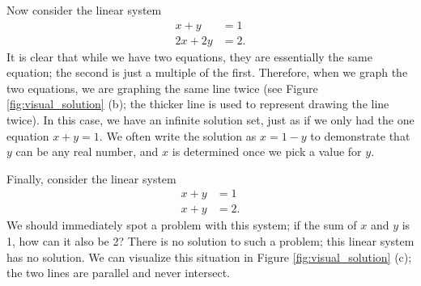 Now consider the linear system 
\begin{align*}
 x+y&=1\\
 2x+2y&=2.
\end{align*}
It is clear that while we have two equations, they are essentially the same equation; the second is just a multiple of the first. Therefore, when we graph the two equations, we are graphing the same line twice (see Figure \ref{fig:visual_solution} (b); the thicker line is used to represent drawing the line twice). In this case, we have an infinite solution set, just as if we only had the one equation $x+y=1$. We often write the solution as $x=1-y$ to demonstrate that $y$ can be any real number, and $x$ is determined once we pick a value for $y$. 


\begin{myfigure}\begin{center}
 \label{fig:visual_solution}
\end{center}
\end{myfigure}

Finally, consider the linear system 
\begin{align*}
 x+y&=1\\
 x+y&=2.
\end{align*}
We should immediately spot a problem with this system; if the sum of $x$ and $y$ is 1, how can it also be 2? There is no solution to such a problem; this linear system has no solution. We can visualize this situation in Figure \ref{fig:visual_solution} (c); the two lines are parallel and never intersect.

